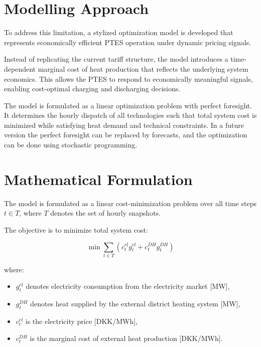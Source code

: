 \section{Modelling Approach}


To address this limitation, a stylized optimization model is developed that represents economically efficient PTES operation under dynamic pricing signals.

Instead of replicating the current tariff structure, the model introduces a time-dependent marginal cost of heat production that reflects the underlying system economics. This allows the PTES to respond to economically meaningful signals, enabling cost-optimal charging and discharging decisions.

The model is formulated as a linear optimization problem with perfect foresight. It determines the hourly dispatch of all technologies such that total system cost is minimized while satisfying heat demand and technical constraints. In a future version the perfect foresight can be replaced by forecasts, and the optimization can be done using stochastic programming. 

\section{Mathematical Formulation}

The model is formulated as a linear cost-minimization problem over all time steps \( t \in T \), where \(T\) denotes the set of hourly snapshots.

The objective is to minimize total system cost:

\begin{equation}
\min \sum_{t \in T} \left( c^{el}_t g^{el}_t + c^{DH}_t g^{DH}_t \right)
\end{equation}

where:
\begin{itemize}
    \item \(g^{el}_t\) denotes electricity consumption from the electricity market [MW],
    \item \(g^{DH}_t\) denotes heat supplied by the external district heating system [MW],
    \item \(c^{el}_t\) is the electricity price [DKK/MWh],
    \item \(c^{DH}_t\) is the marginal cost of external heat production [DKK/MWh].
\end{itemize}

